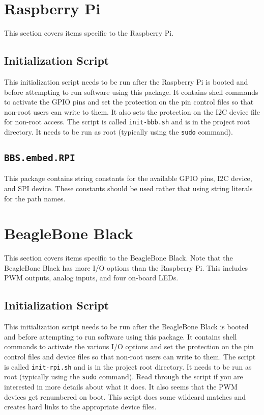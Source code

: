 \documentclass[10pt, openany]{book}
\newcommand{\package}[1]{\texttt{#1}}
\newcommand{\filename}[1]{\texttt{#1}}
\newcommand{\cli}[1]{\texttt{#1}}
\begin{document}
\section{Raspberry Pi}
This section covers items specific to the Raspberry Pi.

\subsection{Initialization Script}
This initialization script needs to be run after the Raspberry Pi is booted and before attempting to run software using this package.  It contains shell commands to activate the GPIO pins and set the protection on the pin control files so that non-root users can write to them.  It also sets the protection on the I2C device file for non-root access.  The script is called \filename{init-bbb.sh} and is in the project root directory.  It needs to be run as root (typically using the \cli{sudo} command).

\subsection{\package{BBS.embed.RPI}}
This package contains string constants for the available GPIO pins, I2C device, and SPI device.  These constants should be used rather that using string literals for the path names.
\section{BeagleBone Black}
This section covers items specific to the BeagleBone Black.  Note that the BeagleBone Black has more I/O options than the Raspberry Pi.  This includes PWM outputs, analog inputs, and four on-board LEDs.

\subsection{Initialization Script}
This initialization script needs to be run after the BeagleBone Black is booted and before attempting to run software using this package.  It contains shell commands to activate the various I/O options and set the protection on the pin control files and device files so that non-root users can write to them.  The script is called \filename{init-rpi.sh} and is in the project root directory.  It needs to be run as root (typically using the \cli{sudo} command).  Read through the script if you are interested in more details about what it does.  It also seems that the PWM devices get renumbered on boot.  This script does some wildcard matches and creates hard links to the appropriate device files.
\end{document}

